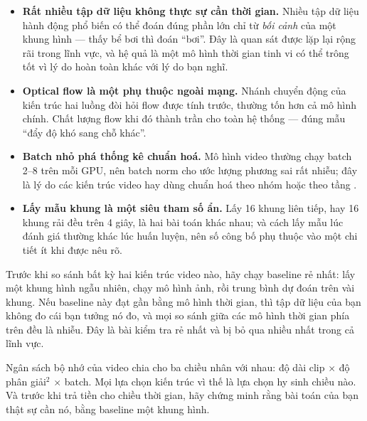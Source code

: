 \documentclass[../../../deep_learning.tex]{subfiles}
\begin{document}
\begin{itemize}
\item \textbf{Rất nhiều tập dữ liệu không thực sự cần thời gian.} Nhiều tập dữ liệu hành động phổ biến có thể đoán đúng phần lớn chỉ từ \emph{bối cảnh} của một khung hình --- thấy bể bơi thì đoán ``bơi''. Đây là quan sát được lặp lại rộng rãi trong lĩnh vực, và hệ quả là một mô hình thời gian tinh vi có thể trông tốt vì lý do hoàn toàn khác với lý do bạn nghĩ.
\item \textbf{Optical flow là một phụ thuộc ngoài mạng.} Nhánh chuyển động của kiến trúc hai luồng đòi hỏi flow được tính trước, thường tốn hơn cả mô hình chính. Chất lượng flow khi đó thành trần cho toàn hệ thống --- đúng mẫu ``đẩy độ khó sang chỗ khác''.
\item \textbf{Batch nhỏ phá thống kê chuẩn hoá.} Mô hình video thường chạy batch 2--8 trên mỗi GPU, nên batch norm cho ước lượng phương sai rất nhiễu; đây là lý do các kiến trúc video hay dùng chuẩn hoá theo nhóm hoặc theo tầng \cite{wu2018groupnorm}.
\item \textbf{Lấy mẫu khung là một siêu tham số ẩn.} Lấy 16 khung liên tiếp, hay 16 khung rải đều trên 4 giây, là hai bài toán khác nhau; và cách lấy mẫu lúc đánh giá thường khác lúc huấn luyện, nên số công bố phụ thuộc vào một chi tiết ít khi được nêu rõ.
\end{itemize}

\begin{cambay}
Trước khi so sánh bất kỳ hai kiến trúc video nào, hãy chạy baseline rẻ nhất: lấy một khung hình ngẫu nhiên, chạy mô hình ảnh, rồi trung bình dự đoán trên vài khung. Nếu baseline này đạt gần bằng mô hình thời gian, thì tập dữ liệu của bạn không đo cái bạn tưởng nó đo, và mọi so sánh giữa các mô hình thời gian phía trên đều là nhiễu. Đây là bài kiểm tra rẻ nhất và bị bỏ qua nhiều nhất trong cả lĩnh vực.
\end{cambay}

\begin{cannho}
Ngân sách bộ nhớ của video chia cho ba chiều nhân với nhau: độ dài clip \(\times\) độ phân giải\(^2\) \(\times\) batch. Mọi lựa chọn kiến trúc vì thế là lựa chọn hy sinh chiều nào. Và trước khi trả tiền cho chiều thời gian, hãy chứng minh rằng bài toán của bạn thật sự cần nó, bằng baseline một khung hình. 
\end{cannho}
\end{document}
